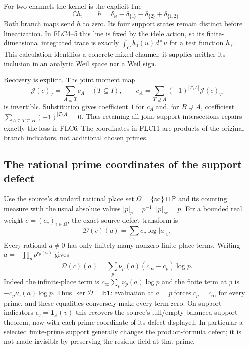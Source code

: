 \documentclass[11pt]{article}
\begin{document}
For two channels the kernel is the explicit line
\[
\mathbb C h,\qquad
h=\delta_\varnothing-\delta_{\{1\}}-\delta_{\{2\}}
                         +\delta_{\{1,2\}}.
\tag{FLC10}
\]
Both branch maps send $h$ to zero. Its four support states remain
distinct before linearization. In FLC4--5 this line is fixed by the
idele action, so its finite-dimensional integrated trace is exactly
$\int_C h_0(u)\,d^\times u$ for a test function $h_0$.
This calculation identifies a concrete mixed channel; it supplies
neither its inclusion in an analytic Weil space nor a Weil sign.

Recovery is explicit. The joint moment map
\[
\mathcal J(c)_T=\sum_{A\supseteq T}c_A
\quad(T\subseteq I),\qquad
c_A=\sum_{T\supseteq A}(-1)^{|T\setminus A|}\mathcal J(c)_T
\tag{FLC11}
\]
is invertible. Substitution gives coefficient $1$ for $c_A$ and,
for $B\supsetneq A$, coefficient
$\sum_{A\subseteq T\subseteq B}(-1)^{|T\setminus A|}=0$.
Thus retaining all joint support intersections repairs exactly the
loss in FLC6. The coordinates in FLC11 are products of the original
branch indicators, not additional chosen primes.

\subsection{The rational prime coordinates of the support defect}
Use the source's standard rational place set
$\Omega=\{\infty\}\sqcup\mathbb P$ and its counting measure with
the usual absolute values $|p|_p=p^{-1}$, $|p|_\infty=p$.
For a bounded real weight $c=(c_v)_{v\in\Omega}$, the exact source
defect transform is
\[
\mathscr D(c)(a)=\sum_v c_v\log|a|_v.
\tag{FLC12}
\]
Every rational $a\ne0$ has only finitely many nonzero finite-place
terms. Writing $a=\pm\prod_p p^{\nu_p(a)}$ gives
\[
\boxed{\mathscr D(c)(a)
   =\sum_p\nu_p(a)(c_\infty-c_p)\log p.}
\tag{FLC13}
\]
Indeed the infinite-place term is
$c_\infty\sum_p\nu_p(a)\log p$ and the finite term at $p$ is
$-c_p\nu_p(a)\log p$. Thus
$\ker\mathscr D=\mathbb R\mathbf1$:
evaluation at $a=p$ forces $c_p=c_\infty$ for every prime, and these
equalities conversely make every term zero. On support indicators
$c_v=\mathbf1_A(v)$ this recovers the source's full/empty balanced
support theorem, now with each prime coordinate of its defect
displayed. In particular a selected finite-prime support generally
changes the product-formula defect; it is not made invisible by
preserving the residue field at that prime.
\end{document}
